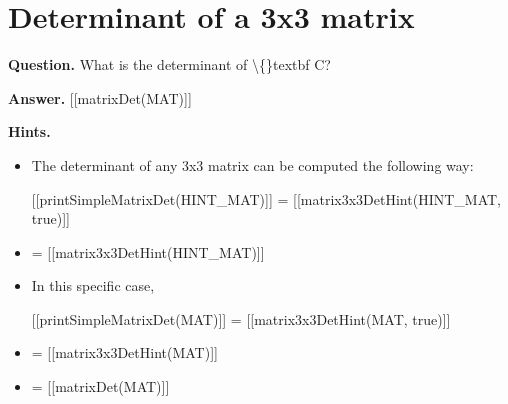 \documentclass{article}
\begin{document}
\section*{Determinant of a 3x3 matrix}
\textbf{Question.} What is the determinant of \textbackslash\{\}textbf C?

\textbf{Answer.} [[matrixDet(MAT)]]

\textbf{Hints.}
\begin{itemize}
  \item The determinant of any 3x3 matrix can be computed the following way:
                    
                        
                            [[printSimpleMatrixDet(HINT\_MAT)]]
                            = [[matrix3x3DetHint(HINT\_MAT, true)]]
  \item = [[matrix3x3DetHint(HINT\_MAT)]]
  \item In this specific case,
                    
                        
                            [[printSimpleMatrixDet(MAT)]]
                            = [[matrix3x3DetHint(MAT, true)]]
  \item = [[matrix3x3DetHint(MAT)]]
  \item = [[matrixDet(MAT)]]
\end{itemize}
\end{document}
